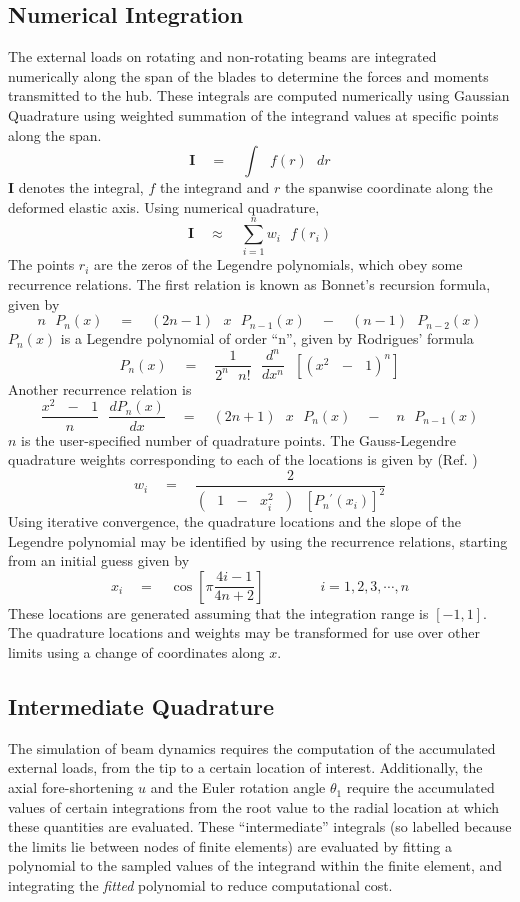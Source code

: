 \subsection*{\textbf{Numerical Integration}}

The external loads on rotating and non-rotating beams are integrated numerically along the span of the blades to determine the forces and moments transmitted to the hub. These integrals are computed numerically using Gaussian Quadrature using weighted summation of the integrand values at specific points along the span. 
\[ \textbf{I} \quad = \quad \int \textrm{ }f(r) \textrm{ } dr \]
\textbf{I} denotes the integral, $f$ the integrand and $r$ the spanwise coordinate along the deformed elastic axis. Using numerical quadrature, 
\[ \textbf{I} \quad \approx \quad \sum_{i=1}^{n} w_i \textrm{ } f(r_i) \]
The points $r_i$ are the zeros of the Legendre polynomials, which obey some recurrence relations. The first relation is known as Bonnet's recursion formula, given by 
\[ n \textrm{ } P_n(x) \quad = \quad (2n-1) \textrm{ } x \textrm{ } P_{n-1}(x) \quad - \quad (n-1) \textrm{ } P_{n-2}(x) \]
$P_n(x)$ is a Legendre polynomial of order ``n'', given by Rodrigues' formula
\[ P_n(x) \quad = \quad \frac{1}{2^n \textrm{ }n!} \textrm{ }\frac{d^n}{dx^n} \textrm{ }\left[\left(x^2\textrm{ }-\textrm{ }1\right)^n\right] \]
Another recurrence relation is 
\[ \frac{x^2\textrm{ } -\textrm{ } 1}{n} \textrm{ } \frac{d P_n(x)}{dx} \quad = \quad (2n+1) \textrm{ } x \textrm{ } P_n(x) \quad - \quad n \textrm{ } P_{n-1}(x) \]
$n$ is the user-specified number of quadrature points. The Gauss-Legendre quadrature weights corresponding to each of the locations is given by (Ref. \cite{Abramowitz1964})
\[ w_i \quad = \quad \frac{2}{\left(\textrm{ } 1\textrm{ } -\textrm{ } x_i^2\textrm{ } \right) \textrm{ } \left[ P_n \textrm{}^\prime (x_i)\right]^2} \]
Using iterative convergence, the quadrature locations and the slope of the Legendre polynomial may be identified by using the recurrence relations, starting from an initial guess given by 
\[  x_i \quad = \quad \cos \left[\pi \frac{4 i - 1}{4n + 2}\right] \qquad \qquad i = 1,2,3,\cdots,n\]
These locations are generated assuming that the integration range is $[-1,1]$. The quadrature locations and weights may be transformed for use over other limits using a change of coordinates along $x$.

\subsection*{\textbf{Intermediate Quadrature}}
The simulation of beam dynamics requires the computation of the accumulated external loads, from the tip to a certain location of interest. Additionally, the axial fore-shortening $u$ and the Euler rotation angle $\theta_1$ require the accumulated values of certain integrations from the root value to the radial location at which these quantities are evaluated. These ``intermediate'' integrals (so labelled because the limits lie between nodes of finite elements) are evaluated by fitting a polynomial to the sampled values of the integrand within the finite element, and integrating the \emph{fitted} polynomial to reduce computational cost. 

